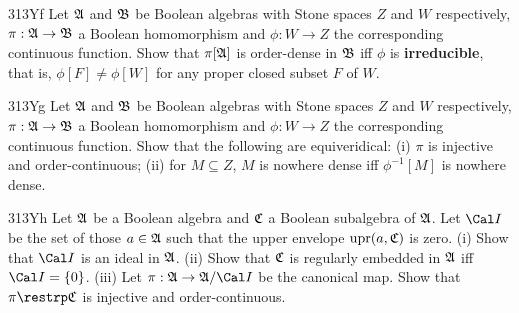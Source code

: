 {\spheader 313Yf Let $\frak A$ and $\frak B$ be Boolean algebras with
Stone spaces $Z$ and $W$ respectively, $\pi:\frak A\to\frak B$ a Boolean
homomorphism and $\phi:W\to Z$ the corresponding continuous function.
Show that $\pi[\frak A]$ is order-dense in $\frak B$ iff $\phi$ is {\bf
irreducible}, that is, $\phi[F]\ne\phi[W]$ for any proper closed subset
$F$ of $W$.

\spheader 313Yg Let $\frak A$ and $\frak B$ be Boolean algebras with
Stone spaces $Z$ and $W$ respectively, $\pi:\frak A\to\frak B$ a Boolean
homomorphism and $\phi:W\to Z$ the corresponding continuous function.
Show that the following are equiveridical: (i) $\pi$ is injective and
order-continuous;  (ii) for $M\subseteq Z$, $M$ is nowhere dense iff
$\phi^{-1}[M]$ is nowhere dense.

\spheader 313Yh Let $\frak A$ be a Boolean algebra and $\frak C$ a Boolean
subalgebra of $\frak A$.
Let $\Cal I$ be the set of those $a\in\frak A$ such that the
upper envelope $\mathop{\text{upr}}(a,\frak C)$ is zero.
(i) Show that $\Cal I$ is an ideal in $\frak A$.
(ii) Show that $\frak C$ is regularly embedded in $\frak A$ iff
$\Cal I=\{0\}$.
(iii) Let $\pi:\frak A\to\frak A/\Cal I$ be the canonical map.
Show that $\pi\restrp\frak C$ is injective and order-continuous.
}%

